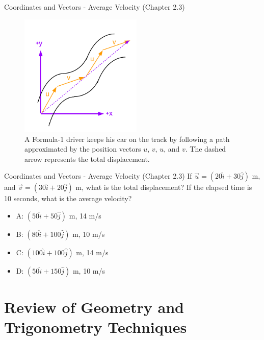 \documentclass{beamer}
\begin{document}
\begin{frame}{Coordinates and Vectors - Average Velocity (Chapter 2.3)}
\begin{figure}
\centering
\includegraphics[width=0.52\textwidth]{figures/AveVelocity.pdf}
\caption{\label{fig:avevel} A Formula-1 driver keeps his car on the track by following a path approximated by the position vectors $u$, $v$, $u$, and $v$.  The dashed arrow represents the total displacement.}
\end{figure}
\end{frame}

\begin{frame}{Coordinates and Vectors - Average Velocity (Chapter 2.3)}
If $\vec{u} = (20\hat{i}+30\hat{j})$ m, and $\vec{v} = (30\hat{i}+20\hat{j})$ m, what is the total displacement?  If the elapsed time is 10 seconds, what is the average velocity? \\
\vspace{0.2cm}
\begin{itemize}
\item A: $(50\hat{i} + 50\hat{j})$ m, 14 m/s
\item B: $(80\hat{i} + 100\hat{j})$ m, 10 m/s
\item C: $(100\hat{i} + 100\hat{j})$ m, 14 m/s
\item D: $(50\hat{i} + 150\hat{j})$ m, 10 m/s
\end{itemize}
\end{frame}

\section{Review of Geometry and Trigonometry Techniques}
\end{document}
